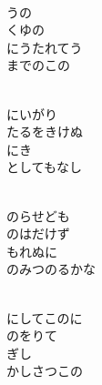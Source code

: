 \documentclass[10pt,b5j]{tarticle} %
\begin{document}
\begin{enumerate}
\begin{minipage}[c]{\blocksize}
    \end{minipage}
    \begin{minipage}[c]{\blocksize}
        
        \vspace{\linespace}
        \item~\\
        うの\\
        くゆの\\
        にうたれてう\\
        までのこの
        
    \end{minipage}
    \begin{minipage}[c]{\blocksize}
        
        \vspace{\linespace}
        \item~\\
        にいがり\\
        たるをきけぬ\\
        にき\\
        としてもなし
        
    \end{minipage}
    \begin{minipage}[c]{\blocksize}
        
        \vspace{\linespace}
        \item~\\
        のらせども\\
        のはだけず\\
        もれぬに\\
        のみつのるかな
        
    \end{minipage}
    \begin{minipage}[c]{\blocksize}
        
        \vspace{\linespace}
        \item~\\
        にしてこのに\\
        のをりて\\
        ぎし\\
        かしさつこの
    
    \end{minipage}
\end{enumerate} %
\end{document}
